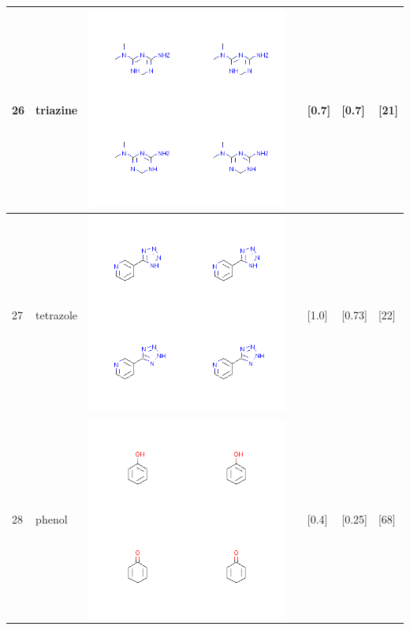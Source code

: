 \begin{longtable}{|l|l|l|l|l|l|l|}
\hline
26 & triazine & \includegraphics[scale=0.6]{triazineCA.png} & & [0.7]& [0.7] & [21] \\
\hline
27 & tetrazole & \includegraphics[scale=0.6]{tetrazoleCA.png} & & [1.0]& [0.73] & [22] \\
\hline
28 & phenol & \includegraphics[scale=0.6]{phenolCA.png} & & [0.4]& [0.25] & [68] \\

\end{longtable}
